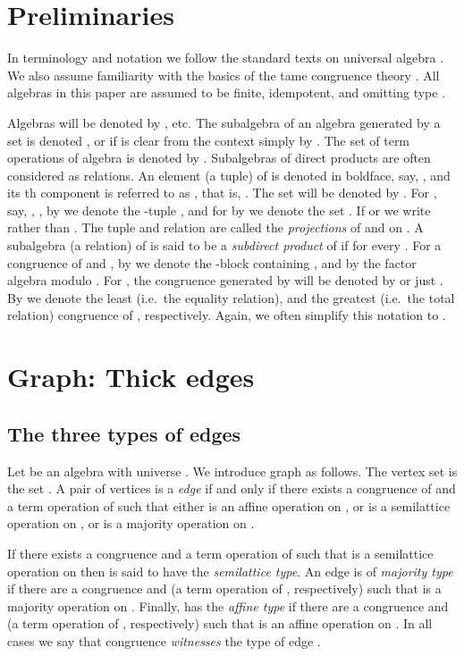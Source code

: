 \documentclass[11pt]{article}
\begin{document}
\section{Preliminaries}\label{sec:preliminaries}

In terminology and notation we follow the standard texts on universal algebra
\cite{Burris81:universal,Mckenzie87:algebras}. We also assume familiarity with
the basics of the tame congruence theory \cite{Hobby88:structure}. All algebras in this paper
are assumed to be finite, idempotent, and omitting type \one.

Algebras will be denoted by , etc. The subalgebra of an algebra  generated by 
a set  is denoted , or if  is clear from the context simply by
. The set of term operations of algebra  is denoted by .
Subalgebras of direct products are often considered as relations. An element
(a tuple) of  is denoted in boldface, say, , and its th component
is referred to as , that is, . The set  will be denoted 
by . For , say, , , by  we denote
the -tuple , and for  by 
we denote the set . If  or  we write 
 rather than . The tuple  and relation  are called
the \emph{projections} of  and  on . A subalgebra (a relation) 
of  is said to be a \emph{subdirect product} of  if 
for every . For a congruence  of  and , by  we denote 
the -block containing , and by  the factor algebra modulo .
For , the congruence generated by  will be denoted by 
or just . By  we denote the least (i.e.\ the equality relation),
and the greatest (i.e.\ the total relation) congruence of , respectively. Again, we 
often simplify this notation to .



\section{Graph: Thick edges}\label{sec:thick}


\subsection{The three types of edges}\label{sec:three-types}

Let  be an algebra with universe .
We introduce graph   as follows. The vertex set
is the set . A pair  of vertices is a \emph{edge} if and only if
there exists a congruence  of  and a term operation of  such 
that either  is an affine 
operation on , or  is a semilattice operation on
, or  is a majority operation on
. 

If there exists a congruence and a term operation of  such that  
is a semilattice operation on  then  is said to have the
{\em semilattice type}. An edge  is of {\em majority type} if there are 
a congruence  and  (a term operation of , respectively)
 such that  is a majority operation on . Finally,  
has the {\em affine type} if there are a congruence  and  
(a term operation of , respectively) such that  is an affine operation 
on .  In all cases we say that congruence  \emph{witnesses}
the type of edge .
\end{document}
